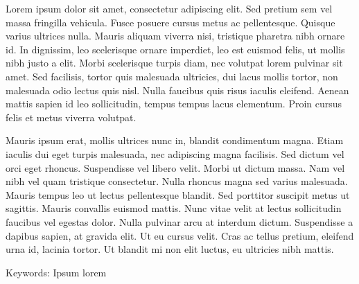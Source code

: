 
Lorem ipsum dolor sit amet, consectetur adipiscing elit. Sed pretium
sem vel massa fringilla vehicula. Fusce posuere cursus metus ac
pellentesque. Quisque varius ultrices nulla. Mauris aliquam viverra
nisi, tristique pharetra nibh ornare id. In dignissim, leo scelerisque
ornare imperdiet, leo est euismod felis, ut mollis nibh justo a elit.
Morbi scelerisque turpis diam, nec volutpat lorem pulvinar sit amet.
Sed facilisis, tortor quis malesuada ultricies, dui lacus mollis
tortor, non malesuada odio lectus quis nisl. Nulla faucibus quis risus
iaculis eleifend. Aenean mattis sapien id leo sollicitudin, tempus
tempus lacus elementum. Proin cursus felis et metus viverra volutpat.

Mauris ipsum erat, mollis ultrices nunc in, blandit condimentum magna.
Etiam iaculis dui eget turpis malesuada, nec adipiscing magna
facilisis. Sed dictum vel orci eget rhoncus. Suspendisse vel libero
velit. Morbi ut dictum massa. Nam vel nibh vel quam tristique
consectetur. Nulla rhoncus magna sed varius malesuada. Mauris tempus
leo ut lectus pellentesque blandit. Sed porttitor suscipit metus ut
sagittis. Mauris convallis euismod mattis. Nunc vitae velit at lectus
sollicitudin faucibus vel egestas dolor. Nulla pulvinar arcu at
interdum dictum. Suspendisse a dapibus sapien, at gravida elit. Ut eu
cursus velit. Cras ac tellus pretium, eleifend urna id, lacinia
tortor. Ut blandit mi non elit luctus, eu ultricies nibh mattis.

Keywords: Ipsum lorem